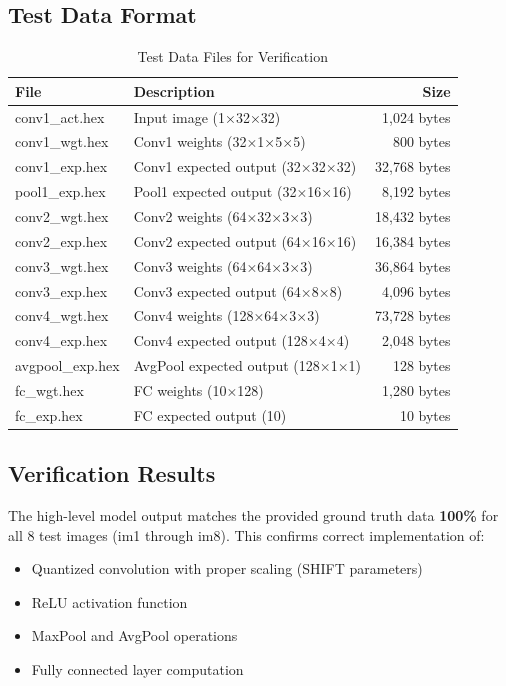 \documentclass[11pt,a4paper]{article}
\begin{document}
\subsection{Test Data Format}
\begin{table}[H]
\centering
\caption{Test Data Files for Verification}
\begin{tabular}{llr}
\toprule
\textbf{File} & \textbf{Description} & \textbf{Size} \\
\midrule
conv1\_act.hex & Input image (1×32×32) & 1,024 bytes \\
conv1\_wgt.hex & Conv1 weights (32×1×5×5) & 800 bytes \\
conv1\_exp.hex & Conv1 expected output (32×32×32) & 32,768 bytes \\
pool1\_exp.hex & Pool1 expected output (32×16×16) & 8,192 bytes \\
conv2\_wgt.hex & Conv2 weights (64×32×3×3) & 18,432 bytes \\
conv2\_exp.hex & Conv2 expected output (64×16×16) & 16,384 bytes \\
conv3\_wgt.hex & Conv3 weights (64×64×3×3) & 36,864 bytes \\
conv3\_exp.hex & Conv3 expected output (64×8×8) & 4,096 bytes \\
conv4\_wgt.hex & Conv4 weights (128×64×3×3) & 73,728 bytes \\
conv4\_exp.hex & Conv4 expected output (128×4×4) & 2,048 bytes \\
avgpool\_exp.hex & AvgPool expected output (128×1×1) & 128 bytes \\
fc\_wgt.hex & FC weights (10×128) & 1,280 bytes \\
fc\_exp.hex & FC expected output (10) & 10 bytes \\
\bottomrule
\end{tabular}
\end{table}

\subsection{Verification Results}
The high-level model output matches the provided ground truth data \textbf{100\%} for all 8 test images (im1 through im8). This confirms correct implementation of:
\begin{itemize}
    \item Quantized convolution with proper scaling (SHIFT parameters)
    \item ReLU activation function
    \item MaxPool and AvgPool operations
    \item Fully connected layer computation
\end{itemize}
\end{document}
